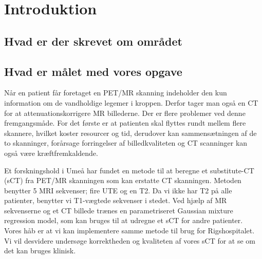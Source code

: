 \section{Introduktion}
\subsection{Hvad er der skrevet om området}


\subsection{Hvad er målet med vores opgave}


Når en patient får foretaget en PET/MR skanning indeholder den kun
information om de vandholdige legemer i kroppen. Derfor tager man også en
CT for at attenuationskorrigere MR billederne. Der er flere problemer ved denne
fremgangsmåde. For det første er at patienten skal flyttes rundt mellem flere
skannere, hvilket koster resourcer og tid, derudover kan sammensætningen af
de to skanninger, forårsage forringelser af billedkvaliteten og CT scanninger
kan også være kræftfremkaldende.

Et forskningshold i Umeå har fundet en metode til at beregne et substitute-CT
(sCT) fra PET/MR skanningen som kan erstatte CT skanningen. Metoden benytter
5 MRI sekvenser; fire UTE og en T2. Da vi ikke har T2 på alle patienter,
benytter vi T1-vægtede sekvenser i stedet. Ved hjælp af MR sekvenserne og
et CT billede trænes en parametriseret Gaussian mixture regression model, som
kan bruges til at udregne et sCT for andre patienter.\\

Vores håb er at vi kan implementere samme metode til brug for Rigshospitalet.
Vi vil desvidere undersøge korrektheden og kvaliteten af vores sCT for at se
om det kan bruges klinisk.\\



